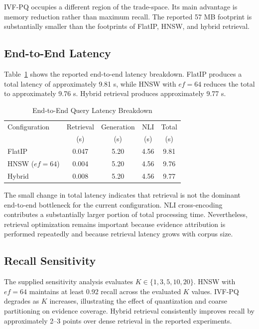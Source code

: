 \documentclass[conference]{IEEEtran}
\begin{document}
IVF-PQ occupies a different region of the trade-space. Its main advantage is memory reduction rather than maximum recall. The reported 57 MB footprint is substantially smaller than the footprints of FlatIP, HNSW, and hybrid retrieval.

\subsection{End-to-End Latency}

Table~\ref{tab:e2e} shows the reported end-to-end latency breakdown. FlatIP produces a total latency of approximately 9.81 s, while HNSW with $ef=64$ reduces the total to approximately 9.76 s. Hybrid retrieval produces approximately 9.77 s.

\begin{table}[t]
\caption{End-to-End Query Latency Breakdown}
\label{tab:e2e}
\centering
\small
\begin{tabular}{@{}lcccc@{}}
\toprule
Configuration & Retrieval & Generation & NLI & Total\\
& (s) & (s) & (s) & (s)\\
\midrule
FlatIP & 0.047 & 5.20 & 4.56 & 9.81\\
HNSW ($ef=64$) & 0.004 & 5.20 & 4.56 & 9.76\\
Hybrid & 0.008 & 5.20 & 4.56 & 9.77\\
\bottomrule
\end{tabular}
\end{table}

The small change in total latency indicates that retrieval is not the dominant end-to-end bottleneck for the current configuration. NLI cross-encoding contributes a substantially larger portion of total processing time. Nevertheless, retrieval optimization remains important because evidence attribution is performed repeatedly and because retrieval latency grows with corpus size.

\subsection{Recall Sensitivity}

The supplied sensitivity analysis evaluates $K\in\{1,3,5,10,20\}$. HNSW with $ef=64$ maintains at least 0.92 recall across the evaluated $K$ values. IVF-PQ degrades as $K$ increases, illustrating the effect of quantization and coarse partitioning on evidence coverage. Hybrid retrieval consistently improves recall by approximately 2--3 points over dense retrieval in the reported experiments.
\end{document}
